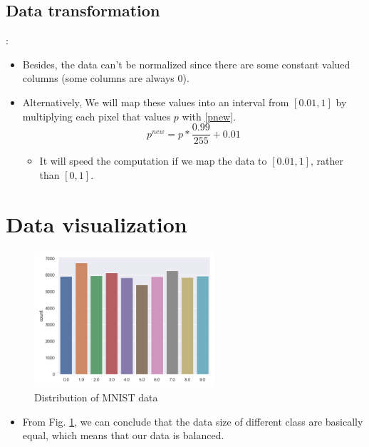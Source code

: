 \documentclass[8pt]{beamer}
\begin{document}
\subsection{Data transformation}
\begin{frame}{\secname : \subsecname}
	\begin{itemize}
  \item Besides, the data can't be normalized since there are some constant valued columns (some columns are always $0$). 
  \item Alternatively, We will map these values into an interval from $[0.01, 1]$ by multiplying each pixel that values $p$ with \eqref{pnew}.
\begin{equation}
	p^{new}=p*\frac{0.99}{255}+0.01\label{pnew}
\end{equation}
	\begin{itemize}
	  \item It will speed the computation if we map the data to $[0.01, 1]$, rather than $[0, 1]$.
	\end{itemize}

\end{itemize}

\end{frame}




\section{Data visualization}
\begin{frame}[allowframebreaks]{\secname}
\begin{figure}[htbp]
\centerline{\includegraphics[width=0.6\textwidth]{figure/distributionplot.png}}
\caption{Distribution of MNIST data}
\label{Distribution of MNIST data}
\end{figure}
\begin{itemize}
  \item From Fig. \ref{Distribution of MNIST data}, we can conclude that the data size of different class are basically equal, which means that our data is balanced.
\end{itemize}
\end{frame}
\end{document}
